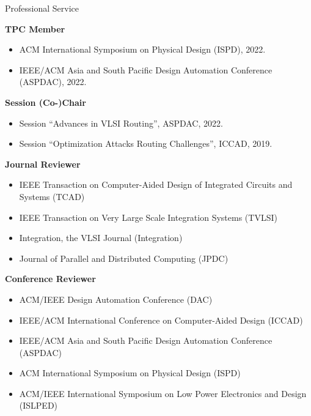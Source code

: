 
\begin{rSection}{Professional Service}

\textbf{TPC Member}
\begin{itemize}
    \item ACM International Symposium on Physical Design (ISPD), 2022.
    \item IEEE/ACM Asia and South Pacific Design Automation Conference (ASPDAC), 2022.
\end{itemize}

\textbf{Session (Co-)Chair}
\begin{itemize}
    \item Session ``Advances in VLSI Routing'', ASPDAC, 2022.
    \item Session ``Optimization Attacks Routing Challenges'', ICCAD, 2019.
\end{itemize}

\textbf{Journal Reviewer}
\begin{itemize}
    \item IEEE Transaction on Computer-Aided Design of Integrated Circuits and Systems (TCAD)
    \item IEEE Transaction on Very Large Scale Integration Systems (TVLSI)
    \item Integration, the VLSI Journal (Integration)
    \item Journal of Parallel and Distributed Computing (JPDC)
\end{itemize}

\textbf{Conference Reviewer}
\begin{itemize}
    \item ACM/IEEE Design Automation Conference (DAC)
    \item IEEE/ACM International Conference on Computer-Aided Design (ICCAD)
    \item IEEE/ACM Asia and South Pacific Design Automation Conference (ASPDAC)
    \item ACM International Symposium on Physical Design (ISPD)
    \item ACM/IEEE International Symposium on Low Power Electronics and Design (ISLPED)
\end{itemize}
\end{rSection}


